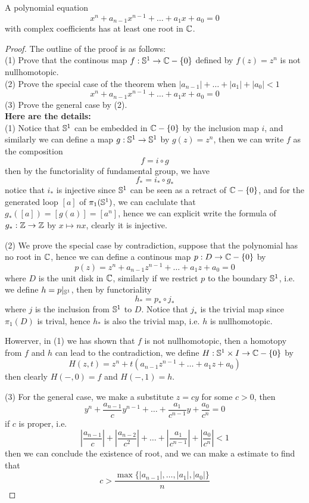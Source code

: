 \documentclass[12pt,a4paper]{article}
\begin{document}
\begin{theorem}
    A polynomial equation
    \[x^n+a_{n-1}x^{n-1}+\dots+a_1x+a_0 = 0\]
    with complex coefficients has at least one root in \(\mathbb{C}\).
\end{theorem}

\begin{proof}
    The outline of the proof is as follows:\\
    (1) Prove that the continous map \(f: \mathbb{S}^1 \to \mathbb{C}-\{0\}\) defined by \(f(z) = z^n\) is not nullhomotopic.\\
    (2) Prove the special case of the theorem when \(|a_{n-1}|+\dots+|a_1|+|a_0|<1\)
    \[x^n+a_{n-1}x^{n-1}+\dots+a_1x+a_0 = 0\]
    (3) Prove the general case by (2).\\

   \textbf{ Here are the details:}\\
    (1) Notice that \(\mathbb{S}^1\) can be embedded in \(\mathbb{C}-\{0\}\) by the inclusion map \(i\), and similarly we can define a map \(g:\mathbb{S}^1 \to \mathbb{S}^1\) by \(g(z) = z^n\), then we can write \(f\) as the composition
    \[f=i \circ g\]
    then by the functoriality of fundamental group, we have
    \[f_* = i_* \circ g_*\]
    notice that \(i_*\) is injective since \(\mathbb{S}^1\) can be seen as a retract of \(\mathbb{C}-\{0\}\), and for the generated loop \([a]\) of \(\pi_1(\mathbb{S}^1)\), we can caclulate that \(g_*([a]) = [g(a)] = [a^n]\), hence we can explicit write the formula of \(g_*:\mathbb{Z} \to \mathbb{Z}\) by \(x \mapsto nx\), clearly it is injective.
    
    (2) We prove the special case by contradiction, suppose that the polynomial has no root in \(\mathbb{C}\), hence we can define a continous map \(p:D \to \mathbb{C}-\{0\} \) by 
    \[p(z) = z^n+a_{n-1}z^{n-1}+\dots+a_1z+a_0 = 0\]
    where \(D\) is the unit disk in \(\mathbb{C}\), similarly if we restrict \(p\) to the boundary \(\mathbb{S}^1\), i.e. we define \(h = p|_{\mathbb{S}^1}\), then by functoriality
    \[h_* = p_* \circ j_*\]
    where \(j\) is the inclusion from \(\mathbb{S}^1\) to \(D\). Notice that \(j_*\) is the trivial map since \(\pi_1(D)\) is trival, hence \(h_*\) is also the trivial map, i.e. \(h\) is nullhomotopic.

    Howerver, in (1) we has shown that \(f\) is not nullhomotopic, then a homotopy from \(f\) and \(h\) can lead to the contradiction, we define \(H:\mathbb{S}^1 \times I \to \mathbb{C}-\{0\}\) by 
    \[H(z,t) = z^n+t(a_{n-1}z^{n-1}+\dots+a_1z+a_0)\]
    then clearly \(H(-,0) = f\) and \(H(-,1) = h\).

    (3) For the general case, we make a substitute \(z = cy\) for some \(c>0\), then
    \[y^n + \frac{a_{n-1}}{c}y^{n-1}+\dots+\frac{a_1}{c^{n-1}}y+\frac{a_0}{c^n} = 0\]
    if \(c\) is proper, i.e.
    \[|\frac{a_{n-1}}{c}|+|\frac{a_{n-2}}{c^2}|+\dots+|\frac{a_1}{c^{n-1}}|+|\frac{a_0}{c^n}| < 1\]
    then we can conclude the existence of root, and we can make a estimate to find that
    \[c>\frac{\max\{{|a_{n-1}|,\dots,|a_1|,|a_0|}\}}{n}\]
\end{proof}
\end{document}
